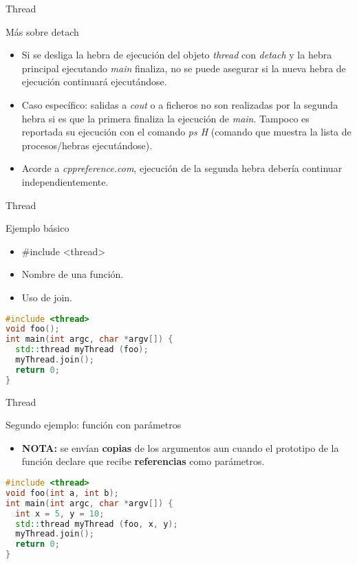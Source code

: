 \begin{frame}{Thread}
\begin{block}{Más sobre detach}
\begin{itemize}
  \item Si se desliga la hebra de ejecución del objeto \textit{thread} con \textit{detach} y la hebra principal ejecutando \textit{main} finaliza, no se puede asegurar si la nueva hebra de ejecución continuará ejecutándose.
  \item Caso específico: salidas a \textit{cout} o a ficheros no son realizadas por la segunda hebra si es que la primera finaliza la ejecución de \textit{main}. Tampoco es reportada su ejecución con el comando \textit{ps H} (comando que muestra la lista de procesos/hebras ejecutándose).
  \item Acorde a \textit{cppreference.com}, ejecución de la segunda hebra debería continuar independientemente.
\end{itemize}
\end{block}
\end{frame}

\begin{frame}[fragile]{Thread}
\begin{block}{Ejemplo básico}
\begin{itemize}
  \item \#include \textless thread\textgreater
  \item Nombre de una función.
  \item Uso de join.
\end{itemize}
\begin{lstlisting}[language=C++, basicstyle=\small]
#include <thread>
void foo();
int main(int argc, char *argv[]) {
  std::thread myThread (foo);
  myThread.join();
  return 0;
}
\end{lstlisting}
\end{block}
\end{frame}

\begin{frame}[fragile]{Thread}
\begin{block}{Segundo ejemplo: función con parámetros}
\begin{itemize}
  \item \textbf{NOTA:} se envían \textbf{copias} de los argumentos aun cuando el prototipo de la función declare que recibe \textbf{referencias} como parámetros.
\end{itemize}
\begin{lstlisting}[language=C++, basicstyle=\small]
#include <thread>
void foo(int a, int b);
int main(int argc, char *argv[]) {
  int x = 5, y = 10;
  std::thread myThread (foo, x, y);
  myThread.join();
  return 0;
}
\end{lstlisting}
\end{block}
\end{frame}

